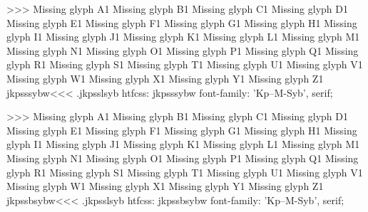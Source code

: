 >>>
Missing glyph	A1
Missing glyph	B1
Missing glyph	C1
Missing glyph	D1
Missing glyph	E1
Missing glyph	F1
Missing glyph	G1
Missing glyph	H1
Missing glyph	I1
Missing glyph	J1
Missing glyph	K1
Missing glyph	L1
Missing glyph	M1
Missing glyph	N1
Missing glyph	O1
Missing glyph	P1
Missing glyph	Q1
Missing glyph	R1
Missing glyph	S1
Missing glyph	T1
Missing glyph	U1
Missing glyph	V1
Missing glyph	W1
Missing glyph	X1
Missing glyph	Y1
Missing glyph	Z1
\<jkpsssybw\><<<
.jkpsslsyb
htfcss:  jkpsssybw  font-family: 'Kp--M-Syb', serif;

>>>
Missing glyph	A1
Missing glyph	B1
Missing glyph	C1
Missing glyph	D1
Missing glyph	E1
Missing glyph	F1
Missing glyph	G1
Missing glyph	H1
Missing glyph	I1
Missing glyph	J1
Missing glyph	K1
Missing glyph	L1
Missing glyph	M1
Missing glyph	N1
Missing glyph	O1
Missing glyph	P1
Missing glyph	Q1
Missing glyph	R1
Missing glyph	S1
Missing glyph	T1
Missing glyph	U1
Missing glyph	V1
Missing glyph	W1
Missing glyph	X1
Missing glyph	Y1
Missing glyph	Z1
\<jkpssbsybw\><<<
.jkpsslsyb
htfcss:  jkpssbsybw  font-family: 'Kp--M-Syb', serif;

